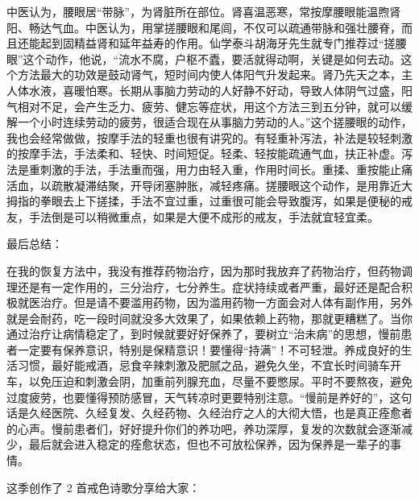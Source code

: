 \begin{description}
    中医认为，腰眼居“带脉”，为肾脏所在部位。肾喜温恶寒，常按摩腰眼能温煦肾阳、畅达气血。中医认为，用掌搓腰眼和尾闾，不仅可以疏通带脉和强壮腰脊，而且还能起到固精益肾和延年益寿的作用。仙学泰斗胡海牙先生就专门推荐过“搓腰眼”这个动作，他说，“流水不腐，户枢不蠹，要活就得动啊，关键是如何去动。这个方法最大的功效是鼓动肾气，短时间内使人体阳气升发起来。肾乃先天之本，主人体水液，喜暖怕寒。长期从事脑力劳动的人好静不好动，导致人体阴气过盛，阳气相对不足，会产生乏力、疲劳、健忘等症状，用这个方法三到五分钟，就可以缓解一个小时连续劳动的疲劳，很适合现在从事脑力劳动的人。”这个搓腰眼的动作，我也会经常做做，按摩手法的轻重也很有讲究的。有轻重补泻法，补法是较轻刺激的按摩手法，手法柔和、轻快、时间短促。轻柔、轻按能疏通气血，扶正补虚。泻法是重刺激的手法，手法重而强，用力由轻入重，作用时间长。重揉、重按能止痛活血，以疏散凝滞结聚，开导闭塞肿胀，减轻疼痛。搓腰眼这个动作，是用靠近大拇指的拳眼去上下搓揉，手法不宜过重，过重很可能会导致腹泻，如果是便秘的戒友，手法倒是可以稍微重点，如果是大便不成形的戒友，手法就宜轻宜柔。
\end{description}

最后总结：

在我的恢复方法中，我没有推荐药物治疗，因为那时我放弃了药物治疗，但药物调理还是有一定作用的，三分治疗，七分养生。症状持续或者严重，最好还是配合积极就医治疗。但是请不要滥用药物，因为滥用药物一方面会对人体有副作用，另外就是会耐药，吃一段时间就没多大效果了，如果依赖上药物，那就更糟糕了。当你通过治疗让病情稳定了，到时候就要好好保养了，要树立“治未病”的思想，慢前患者一定要有保养意识，特别是保精意识！要懂得“持满”！不可轻泄。养成良好的生活习惯，最好能戒酒，忌食辛辣刺激及肥腻之品，避免久坐，不宜长时间骑车开车，以免压迫和刺激会阴，加重前列腺充血，尽量不要憋尿。平时不要熬夜，避免过度疲劳，也要懂得预防感冒，天气转凉时更要特别注意。“慢前是养好的”，这句话是久经医院、久经复发、久经药物、久经治疗之人的大彻大悟，也是真正痊愈者的心声。慢前患者们，好好提升你们的养功吧，养功深厚，复发的次数就会逐渐减少，最后就会进入稳定的痊愈状态，但也不可放松保养，因为保养是一辈子的事情。


这季创作了 2 首戒色诗歌分享给大家：

